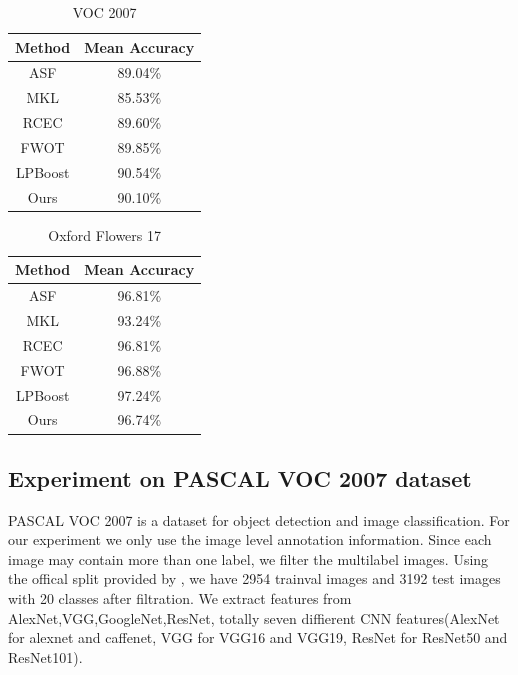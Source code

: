 \documentclass[letterpaper]{article}
\begin{document}
\begin{table}[h]\small
\centering
\label{table:voc2007}
\begin{tabular}{c|c}
\hline
Method                       & Mean Accuracy     \\\hline
ASF                          & 89.04\%           \\
MKL                          & 85.53\%           \\
RCEC                         & 89.60\%           \\
FWOT                         & 89.85\%           \\
LPBoost                      & 90.54\%           \\\hline
Ours                         & 90.10\%           \\
\hline
\end{tabular}
\caption{VOC 2007}
\end{table}


\begin{table}[h]\small
\centering
\label{table:flower17}
\begin{tabular}{c|c}
\hline
Method & Mean Accuracy\\\hline
ASF    &  96.81\% \\
MKL    &  93.24\% \\
RCEC   &  96.81\% \\
FWOT   &  96.88\% \\
LPBoost & 97.24\% \\\hline
Ours   &  96.74\% \\
\hline
\end{tabular}
\caption{Oxford Flowers 17}
\end{table}


\iffalse
\subsection{Experiment on PASCAL VOC 2007 dataset}
PASCAL VOC 2007 is a dataset for object detection and image classification. For our experiment we only use the image level annotation information. Since each image may contain more than one label, we filter the multilabel images. Using the offical split provided by \cite{pascal-voc-2007}, we have 2954 trainval images and 3192 test images with 20 classes after filtration. We extract features from AlexNet,VGG,GoogleNet,ResNet, totally seven diffierent CNN features(AlexNet for alexnet and caffenet, VGG for VGG16 and VGG19, ResNet for ResNet50 and ResNet101).
\end{document}
